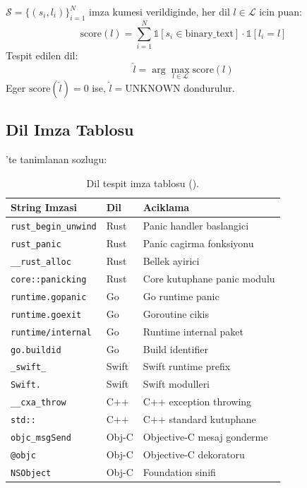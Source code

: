 \begin{tanim}
$\mathcal{S} = \{(s_i, l_i)\}_{i=1}^{N}$ imza kumesi verildiginde, her dil $l \in \mathcal{L}$ icin puan:
\begin{equation}
\label{eq:lang-score}
\text{score}(l) = \sum_{i=1}^{N} \mathbb{1}[s_i \in \text{binary\_text}] \cdot \mathbb{1}[l_i = l]
\end{equation}
Tespit edilen dil:
\begin{equation}
\label{eq:lang-argmax}
\hat{l} = \arg\max_{l \in \mathcal{L}} \text{score}(l)
\end{equation}
Eger $\text{score}(\hat{l}) = 0$ ise, $\hat{l} = \text{UNKNOWN}$ dondurulur.
\end{tanim}

\subsection{Dil Imza Tablosu}

'te tanimlanan  sozlugu:

\begin{table}[htbp]
\centering
\begin{tabular}{lll}
\toprule
\textbf{\color{sectioncyan}String Imzasi} & \textbf{\color{sectioncyan}Dil} & \textbf{\color{sectioncyan}Aciklama} \\
\midrule
\texttt{rust\_begin\_unwind}  & Rust      & Panic handler baslangici \\
\texttt{rust\_panic}          & Rust      & Panic cagirma fonksiyonu \\
\texttt{\_\_rust\_alloc}      & Rust      & Bellek ayirici \\
\texttt{core::panicking}      & Rust      & Core kutuphane panic modulu \\
\texttt{runtime.gopanic}      & Go        & Go runtime panic \\
\texttt{runtime.goexit}       & Go        & Goroutine cikis \\
\texttt{runtime/internal}     & Go        & Runtime internal paket \\
\texttt{go.buildid}           & Go        & Build identifier \\
\texttt{\_swift\_}            & Swift     & Swift runtime prefix \\
\texttt{Swift.}               & Swift     & Swift modulleri \\
\texttt{\_\_cxa\_throw}       & C++       & C++ exception throwing \\
\texttt{std::}                & C++       & C++ standard kutuphane \\
\texttt{objc\_msgSend}        & Obj-C     & Objective-C mesaj gonderme \\
\texttt{@objc}                & Obj-C     & Objective-C dekoratoru \\
\texttt{NSObject}             & Obj-C     & Foundation sinifi \\
\bottomrule
\end{tabular}
\caption{Dil tespit imza tablosu ().}
\label{tab:lang-sigs}
\end{table}

